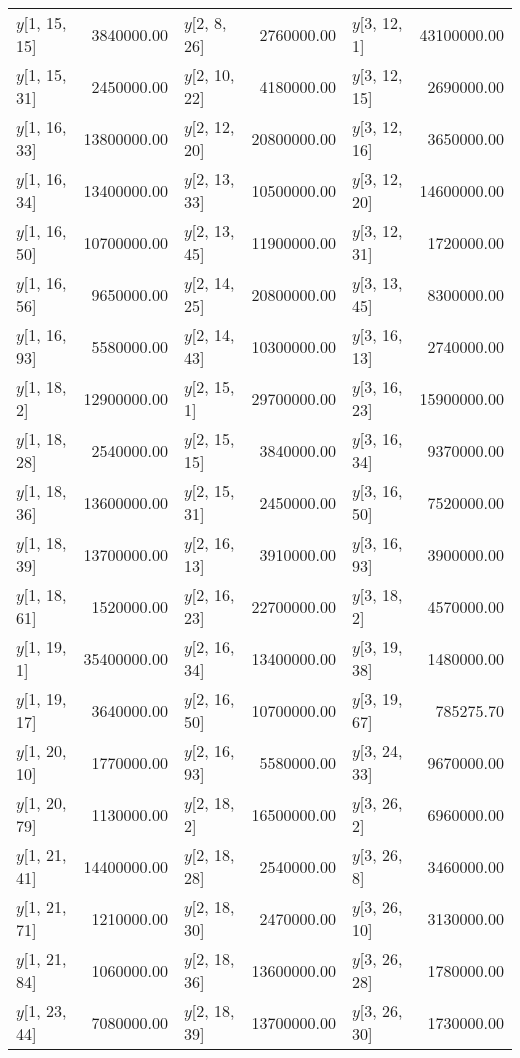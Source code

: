 \begin{longtable}{lrlrlr}
$y$[1, 15, 15] & 3840000.00 & $y$[2, 8, 26] & 2760000.00 & $y$[3, 12, 1] & 43100000.00 \\
$y$[1, 15, 31] & 2450000.00 & $y$[2, 10, 22] & 4180000.00 & $y$[3, 12, 15] & 2690000.00 \\
$y$[1, 16, 33] & 13800000.00 & $y$[2, 12, 20] & 20800000.00 & $y$[3, 12, 16] & 3650000.00 \\
$y$[1, 16, 34] & 13400000.00 & $y$[2, 13, 33] & 10500000.00 & $y$[3, 12, 20] & 14600000.00 \\
$y$[1, 16, 50] & 10700000.00 & $y$[2, 13, 45] & 11900000.00 & $y$[3, 12, 31] & 1720000.00 \\
$y$[1, 16, 56] & 9650000.00 & $y$[2, 14, 25] & 20800000.00 & $y$[3, 13, 45] & 8300000.00 \\
$y$[1, 16, 93] & 5580000.00 & $y$[2, 14, 43] & 10300000.00 & $y$[3, 16, 13] & 2740000.00 \\
$y$[1, 18, 2] & 12900000.00 & $y$[2, 15, 1] & 29700000.00 & $y$[3, 16, 23] & 15900000.00 \\
$y$[1, 18, 28] & 2540000.00 & $y$[2, 15, 15] & 3840000.00 & $y$[3, 16, 34] & 9370000.00 \\
$y$[1, 18, 36] & 13600000.00 & $y$[2, 15, 31] & 2450000.00 & $y$[3, 16, 50] & 7520000.00 \\
$y$[1, 18, 39] & 13700000.00 & $y$[2, 16, 13] & 3910000.00 & $y$[3, 16, 93] & 3900000.00 \\
$y$[1, 18, 61] & 1520000.00 & $y$[2, 16, 23] & 22700000.00 & $y$[3, 18, 2] & 4570000.00 \\
$y$[1, 19, 1] & 35400000.00 & $y$[2, 16, 34] & 13400000.00 & $y$[3, 19, 38] & 1480000.00 \\
$y$[1, 19, 17] & 3640000.00 & $y$[2, 16, 50] & 10700000.00 & $y$[3, 19, 67] & 785275.70 \\
$y$[1, 20, 10] & 1770000.00 & $y$[2, 16, 93] & 5580000.00 & $y$[3, 24, 33] & 9670000.00 \\
$y$[1, 20, 79] & 1130000.00 & $y$[2, 18, 2] & 16500000.00 & $y$[3, 26, 2] & 6960000.00 \\
$y$[1, 21, 41] & 14400000.00 & $y$[2, 18, 28] & 2540000.00 & $y$[3, 26, 8] & 3460000.00 \\
$y$[1, 21, 71] & 1210000.00 & $y$[2, 18, 30] & 2470000.00 & $y$[3, 26, 10] & 3130000.00 \\
$y$[1, 21, 84] & 1060000.00 & $y$[2, 18, 36] & 13600000.00 & $y$[3, 26, 28] & 1780000.00 \\
$y$[1, 23, 44] & 7080000.00 & $y$[2, 18, 39] & 13700000.00 & $y$[3, 26, 30] & 1730000.00 \\

\end{longtable}
